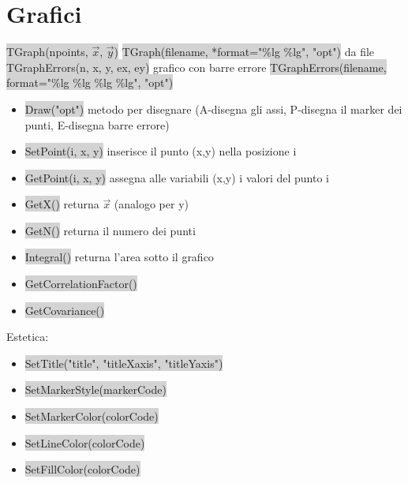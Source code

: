 \documentclass[a4paper]{article}
\begin{document}
\section{Grafici}
    \colorbox{LightGray}{TGraph(npoints, $\vec{x}$, $\vec{y}$)} 
    \colorbox{LightGray}{TGraph(filename, *format="\%lg \%lg", "opt")} da file
    \colorbox{LightGray}{TGraphErrors(n, x, y, ex, ey)} grafico con barre errore
    \colorbox{LightGray}{TGraphErrors(filename, format="\%lg \%lg \%lg \%lg", "opt")}
    \begin{itemize}
        \item \colorbox{LightGray}{Draw("opt")} metodo per disegnare (A-disegna gli assi, P-disegna il marker dei punti, E-disegna barre errore)
        \item \colorbox{LightGray}{SetPoint(i, x, y)} inserisce il punto (x,y) nella posizione i
        \item \colorbox{LightGray}{GetPoint(i, x, y)} assegna alle variabili (x,y) i valori del punto i
        \item \colorbox{LightGray}{GetX()} returna $\vec{x}$ (analogo per y)
        \item \colorbox{LightGray}{GetN()} returna il numero dei punti
        \item \colorbox{LightGray}{Integral()} returna l'area sotto il grafico
        \item \colorbox{LightGray}{GetCorrelationFactor()}
        \item \colorbox{LightGray}{GetCovariance()}
    \end{itemize}
    Estetica:
    \begin{itemize}
        \item \colorbox{LightGray}{SetTitle("title", "titleXaxis", "titleYaxis")}
        \item \colorbox{LightGray}{SetMarkerStyle(markerCode)}
        \item \colorbox{LightGray}{SetMarkerColor(colorCode)}
        \item \colorbox{LightGray}{SetLineColor(colorCode)}
        \item \colorbox{LightGray}{SetFillColor(colorCode)}
    \end{itemize}
\end{document}

